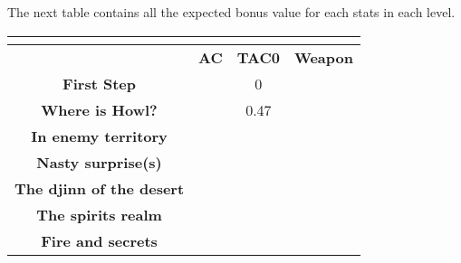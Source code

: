 The next table contains all the expected bonus value for each stats in each level.
\begin{table}[H]
  \centering
\begin{tabular}{c|c|c|l|}
\cline{2-4}
 & \multicolumn{3}{c|}{\cellcolor[HTML]{9B9B9B}{\color[HTML]{FFFFFF} \textbf{Sophie Stats Bonus}}} \\ \hline
\rowcolor[HTML]{C0C0C0} 
\multicolumn{1}{|c|}{\cellcolor[HTML]{9B9B9B}{\color[HTML]{FFFFFF} \textbf{Level}}} & \textbf{AC} & \textbf{TAC0} & \textbf{Weapon}\\\hline
\multicolumn{1}{|c|}{\cellcolor[HTML]{C0C0C0}\textbf{First Step}} &    & 0 & \\ \hline
\multicolumn{1}{|c|}{\cellcolor[HTML]{C0C0C0}\textbf{Where is Howl?}}   &  & 0.47 &  \\ \hline
\multicolumn{1}{|c|}{\cellcolor[HTML]{C0C0C0}\textbf{In enemy territory}}   &  &  &   \\ \hline
\multicolumn{1}{|c|}{\cellcolor[HTML]{C0C0C0}\textbf{Nasty surprise(s)}}   &  &  &  \\ \hline
\multicolumn{1}{|c|}{\cellcolor[HTML]{C0C0C0}\textbf{The djinn of the desert}}   &  &  &  \\ \hline
\multicolumn{1}{|c|}{\cellcolor[HTML]{C0C0C0}\textbf{The spirits realm}} &  &    &  \\ \hline
\multicolumn{1}{|c|}{\cellcolor[HTML]{C0C0C0}\textbf{Fire and secrets}} &  &    &   \\ \hline
\end{tabular}
\end{table}

\begin{table}[H]
\end{table}
